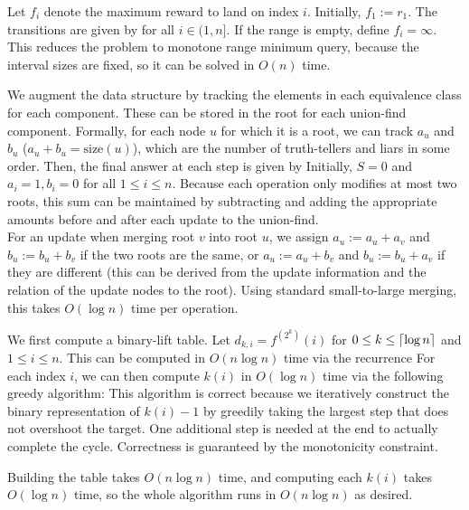 \documentclass{article}
\begin{document}
\maketitle

  Let $f_i$ denote the maximum reward to land on index $i$. Initially, $f_1:= r_1$. The transitions are given by
  for all $i\in (1,n]$. If the range is empty, define $f_i=\infty$. This reduces the problem to monotone range minimum query, because the interval sizes are fixed, so it can be solved in $O(n)$ time.

  We augment the data structure by tracking the elements in each equivalence class for each component. These can be stored in the root for each union-find component. Formally, for each node $u$ for which it is a root, we can track $a_u$ and $b_u$ ($a_u+b_u=\text{size}(u)$), which are the number of truth-tellers and liars in some order. Then, the final answer at each step is given by
  Initially, $S=0$ and $a_i=1,b_i=0$ for all $1\leq i\leq n$. Because each operation only modifies at most two roots, this sum can be maintained by subtracting and adding the appropriate amounts before and after each update to the union-find.\\

  For an update when merging root $v$ into root $u$, we assign $a_u:= a_u+a_v$ and $b_u:=b_u+b_v$ if the two roots are the same, or $a_u:= a_u+b_v$ and $b_u:=b_u+a_v$ if they are different (this can be derived from the update information and the relation of the update nodes to the root). Using standard small-to-large merging, this takes $O(\log n)$ time per operation.

  We first compute a binary-lift table. Let $d_{k,i}=f^(2^k)(i)$ for $0\leq k\leq \left\lceil \log n \right\rceil$ and $1\leq i\leq n$. This can be computed in $O(n\log n)$ time via the recurrence
  For each index $i$, we can then compute $k(i)$ in $O(\log n)$ time via the following greedy algorithm:
  This algorithm is correct because we iteratively construct the binary representation of $k(i)-1$ by greedily taking the largest step that does not overshoot the target. One additional step is needed at the end to actually complete the cycle. Correctness is guaranteed by the monotonicity constraint. 

  Building the table takes $O(n\log n)$ time, and computing each $k(i)$ takes $O(\log n)$ time, so the whole algorithm runs in $O(n\log n)$ as desired.
  
\end{document}
